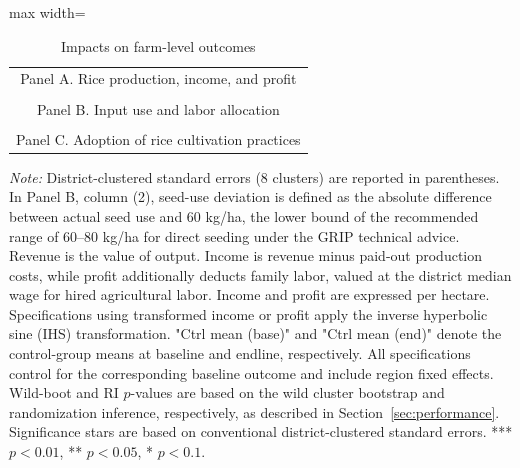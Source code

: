 \documentclass[11pt]{article}
\makeatletter
\newenvironment{panels}
  {\par\centering\begin{adjustbox}{max width=\linewidth}\scriptsize\begin{tabular}{@{}c@{}}}
  {\end{tabular}\end{adjustbox}\par}
\newcommand{\panel}[1]{\rule{0pt}{20pt}\small{#1}\\[6pt]}
\newcommand{\tnote}[1]{%
  \par\vspace{3pt}%
  \noindent\begin{minipage}{\linewidth}%
    \scriptsize\setlength{\parindent}{0pt}\textit{Note:} #1%
  \end{minipage}}
\makeatother
\begin{document}
\begin{table}[H]
\caption{Impacts on farm-level outcomes}
\label{tab:farmimpact}
\begin{panels}
\panel{Panel A. Rice production, income, and profit}
\\[18pt]
\panel{Panel B. Input use and labor allocation}
\\[18pt]
\panel{Panel C. Adoption of rice cultivation practices}

\end{panels}
\tnote{District-clustered standard errors (8 clusters) are reported in parentheses. In Panel B, column (2), seed-use deviation is defined as the absolute difference between actual seed use and 60 kg/ha, the lower bound of the recommended range of 60--80 kg/ha for direct seeding under the GRIP technical advice. Revenue is the value of output. Income is revenue minus paid-out production costs, while profit additionally deducts family labor, valued at the district median wage for hired agricultural labor. Income and profit are expressed per hectare. Specifications using transformed income or profit apply the inverse hyperbolic sine (IHS) transformation. "Ctrl mean (base)" and "Ctrl mean (end)" denote the control-group means at baseline and endline, respectively. All specifications control for the corresponding baseline outcome and include region fixed effects. Wild-boot and RI $p$-values are based on the wild cluster bootstrap and randomization inference, respectively, as described in Section~\ref{sec:performance}. Significance stars are based on conventional district-clustered standard errors. *** $p<0.01$, ** $p<0.05$, * $p<0.1$.}
\end{table}


\end{document}
